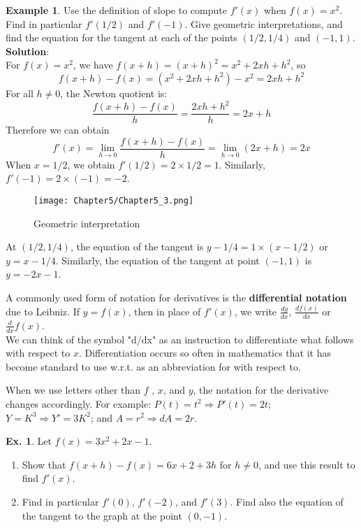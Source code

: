\documentclass[10pt,a4paper]{book}
\theoremstyle{definition}\newtheorem{definition}{Definition}
\theoremstyle{definition}\newtheorem{fact}{Fact}
\theoremstyle{definition}\newtheorem{ex}{Ex.}
\theoremstyle{definition}\newtheorem{project}{Project}
\theoremstyle{definition}\newtheorem{problem}{Problem}
\theoremstyle{definition}\newtheorem{example}{Example}
\numberwithin{theorem}{chapter}
\numberwithin{corollary}{chapter}
\numberwithin{assumption}{chapter}
\numberwithin{definition}{chapter}
\numberwithin{prop}{chapter}
\numberwithin{notation}{chapter}
\numberwithin{problem}{chapter}
\numberwithin{example}{chapter}
\numberwithin{fact}{chapter}
\numberwithin{ex}{chapter}
\begin{document}
	
	\begin{example}
		Use the definition of slope to compute $f'(x)$ when $f(x)=x^2$. Find in particular $f '(1/2)$ and $f '(-1)$. Give geometric interpretations, and find the equation for the tangent at each of the points $(1/2, 1/4)$ and $(-1, 1)$.
		\\
		\textbf{Solution}:
		\\
		For $f(x)=x^2$, we have $f(x+h)=(x+h)^2 =x^2 +2xh+h^2$, so
		$$f(x+h) - f(x) = (x^2+2xh+h^2)-x^2 = 2xh + h^2$$
		For all $h \neq 0$, the Newton quotient is:
		$$\frac{f(x+h)-f(x)}{h} = \frac{2xh+h^2}{h} = 2x + h$$
		Therefore we can obtain
		$$f'(x) = \lim_{h \rightarrow 0} \frac{f(x+h)-f(x)}{h} = \lim_{h \rightarrow 0} (2x+h) = 2x$$
		When $x = 1/2$, we obtain $f '(1/2) = 2 \times 1/2 = 1$. Similarly, $f '(-1) = 2 \times (-1) = -2$.
		
		\begin{figure}
			\centering
			\texttt{[image: Chapter5/Chapter5\_3.png]}
			\caption{Geometric interpretation}
		\end{figure}
		
		At $(1/2,1/4)$, the equation of the tangent is $y-1/4 = 1 \times (x-1/2)$ or $y = x - 1/4$. Similarly, the equation of the tangent at point $(-1,1)$ is $y=-2x-1$.
	\end{example}
	
	A commonly used form of notation for derivatives is the \textbf{differential notation} due to Leibniz. If $y=f(x)$, then in place of $f'(x)$, we write $\frac{dy}{dx}$, $\frac{df(x)}{dx}$ or $\frac{d}{dx}f(x)$.
	\\
	We can think of the symbol "d/dx" as an instruction to differentiate what follows with respect to $x$. Differentiation occurs so often in mathematics that it has become standard to use w.r.t. as an abbreviation for with respect to.
	
	When we use letters other than $f$ , $x$, and $y$, the notation for the derivative changes accordingly. For example:
	$P(t)=t^2 \Rightarrow P'(t)=2t$; $Y =K^3 \Rightarrow Y' =3K^2$; and $A=r^2 \Rightarrow dA =2r$.
	
	\begin{ex}
		Let $f(x)=3x^2 +2x-1$.
		\begin{enumerate}[label=(\alph*)]
			\item Show that $f(x+h)-f(x) =6x+2+3h$ for $h \neq 0$, and use this result to find $f'(x)$.
			\item Find in particular $f'(0)$, $f'(-2)$, and $f'(3)$. Find also the equation of the tangent to the graph at the point $(0, -1)$.
		\end{enumerate}
	\end{ex}
	
\end{document}
